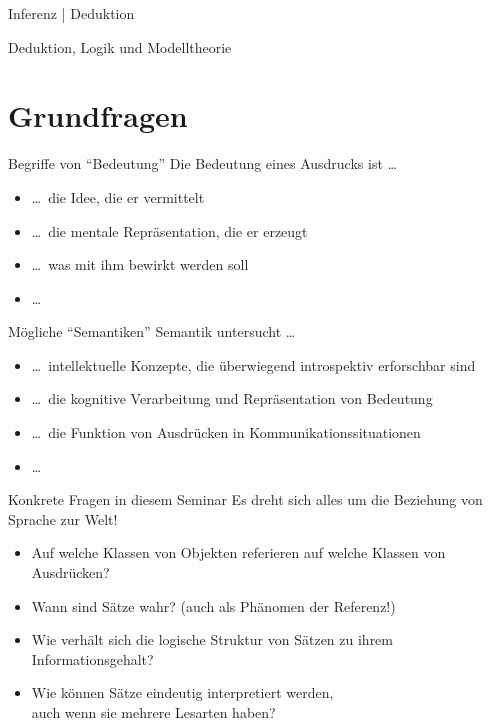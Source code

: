 \begin{frame}
  {Inferenz | Deduktion}
\end{frame}

\begin{frame}
  {Deduktion, Logik und Modelltheorie}
\end{frame}

\section{Grundfragen}

\begin{frame}
  {Begriffe von "`Bedeutung"'}
  \onslide<+->
  \onslide<+->
  Die Bedeutung eines Ausdrucks ist \ldots\\
  \Zeile
  \begin{itemize}[<+->]
    \item \ldots\ die Idee, die er vermittelt
    \item \ldots\ die mentale Repräsentation, die er erzeugt
    \item \ldots\ was mit ihm bewirkt werden soll
    \item \ldots\ 
  \end{itemize}
\end{frame}

\begin{frame}
  {Mögliche "`Semantiken"'}
  \onslide<+->
  \onslide<+->
  Semantik untersucht \ldots\\
  \begin{itemize}[<+->]
    \item \ldots\ intellektuelle Konzepte, die überwiegend introspektiv erforschbar sind
    \item \ldots\ die kognitive Verarbeitung und Repräsentation von Bedeutung
    \item \ldots\ die Funktion von Ausdrücken in Kommunikationssituationen
    \item \ldots\ 
  \end{itemize}
\end{frame}

\begin{frame}
  {Konkrete Fragen in diesem Seminar}
  \onslide<+->
  \onslide<+->
  Es dreht sich alles um die Beziehung von Sprache zur Welt!\\
  \Zeile
  \begin{itemize}[<+->]
    \item Auf welche Klassen von Objekten \alert{referieren} auf welche Klassen von Ausdrücken?
    \item Wann sind Sätze wahr? (auch als Phänomen der \alert{Referenz}!)
    \item Wie verhält sich die logische Struktur von Sätzen zu ihrem Informationsgehalt?
    \item Wie können Sätze eindeutig interpretiert werden,\\
      auch wenn sie mehrere Lesarten haben?
  \end{itemize}
\end{frame}

